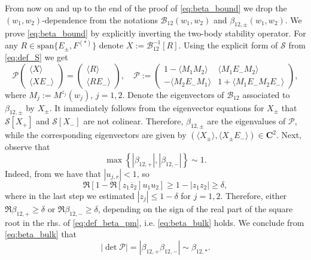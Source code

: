 \documentclass[10pt]{amsart}
\numberwithin{equation}{section}
\newcommand{\C}{\mathbf{C}}
\begin{document}
From now on and up to the end of the proof of \eqref{eq:beta_bound} we drop the $(w_1,w_2)$-dependence from the notations $\mathcal{B}_{12}(w_1,w_2)$ and $\beta_{12,\pm}(w_1,w_2)$. We prove \eqref{eq:beta_bound} by explicitly inverting the two-body stability operator. For any $R\in\mathrm{span}\{E_\pm,F^{(*)}\}$ denote $X:=\mathcal{B}_{12}^{-1}[R]$. Using the explicit form of $\mathcal{S}$ from \eqref{eq:def_S} we get
\begin{equation}
\mathcal{P}
\begin{pmatrix}
\langle X\rangle\\ \langle XE_-\rangle
\end{pmatrix}
=
\begin{pmatrix}
\langle R\rangle\\ \langle RE_-\rangle
\end{pmatrix},\quad \mathcal{P}:= \begin{pmatrix}
1-\langle M_1M_2\rangle&\langle M_1E_-M_2\rangle\\ 
-\langle M_2E_-M_1\rangle & 1+\langle M_1E_-M_2E_-\rangle
\end{pmatrix},
\label{eq:B_inverse_aux}
\end{equation}
where $M_j:=M^{z_j}(w_j)$, $j=1,2$. Denote the eigenvectors of $\mathcal{B}_{12}$ associated to $\beta_{12,\pm}$ by $X_\pm$. It immediately follows from the eigenvector equations for $X_\pm$ that $\mathcal{S}[X_+]$ and $\mathcal{S}[X_-]$ are not colinear. Therefore, $\beta_{12,\pm}$ are the eigenvalues of $\mathcal{P}$, while the corresponding eigenvectors are given by $(\langle X_\pm \rangle,\langle X_\pm E_-\rangle)\in\C^2$. Next, observe that
\begin{equation}
\max\left\lbrace |\beta_{12,+}|,|\beta_{12,-}|\right\rbrace\sim 1.
\label{eq:beta_bulk}
\end{equation}
Indeed, from \cite[Eq. (3.5)]{macroCLT_real} we have that $|u_{j,r}|<1$, so
\begin{equation}
\Re\left[ 1-\Re [z_1\overline{z}_2]u_1u_2\right] \ge 1-|z_1z_2|\ge \delta,
\label{eq:Re_beta}
\end{equation}
where in the last step we estimated $|z_j|\le 1-\delta$ for $j=1,2$. Therefore, either $\Re \beta_{12,+}\ge \delta$ or $\Re \beta_{12,-}\ge \delta$, depending on the sign of the real part of the square root in the rhs. of \eqref{eq:def_beta_pm}, i.e. \eqref{eq:beta_bulk} holds. We conclude from \eqref{eq:beta_bulk} that
\begin{equation}
\left\vert\det \mathcal{P}\right\vert = \left\vert \beta_{12,+}\beta_{12,-}\right\vert \sim \beta_{12,*}.
\label{eq:detP}
\end{equation}
\end{document}
